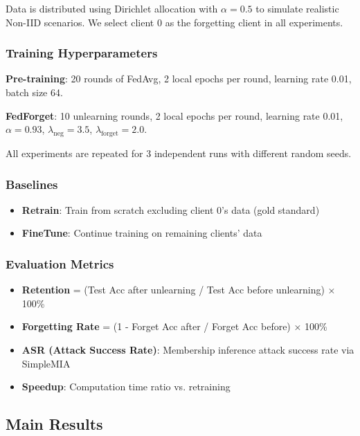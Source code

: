 \documentclass[10pt,twocolumn]{article}
\begin{document}
Data is distributed using Dirichlet allocation with $\alpha=0.5$ to simulate realistic Non-IID scenarios. We select client 0 as the forgetting client in all experiments.

\subsubsection{Training Hyperparameters}

\textbf{Pre-training}: 20 rounds of FedAvg, 2 local epochs per round, learning rate 0.01, batch size 64.

\textbf{FedForget}: 10 unlearning rounds, 2 local epochs per round, learning rate 0.01, $\alpha=0.93$, $\lambda_{\text{neg}}=3.5$, $\lambda_{\text{forget}}=2.0$.

All experiments are repeated for 3 independent runs with different random seeds.

\subsubsection{Baselines}

\begin{itemize}
\item \textbf{Retrain}: Train from scratch excluding client 0's data (gold standard)
\item \textbf{FineTune}: Continue training on remaining clients' data
\end{itemize}

\subsubsection{Evaluation Metrics}

\begin{itemize}
\item \textbf{Retention} = (Test Acc after unlearning / Test Acc before unlearning) × 100\%
\item \textbf{Forgetting Rate} = (1 - Forget Acc after / Forget Acc before) × 100\%
\item \textbf{ASR (Attack Success Rate)}: Membership inference attack success rate via SimpleMIA
\item \textbf{Speedup}: Computation time ratio vs. retraining
\end{itemize}

\subsection{Main Results}
\end{document}

